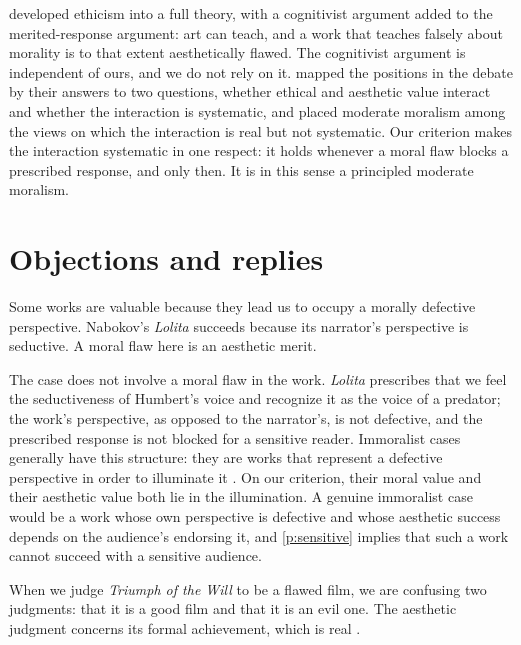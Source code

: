 \documentclass{situationist-preprint}
\begin{document}
\citet{Gaut2007} developed ethicism into a full theory, with a cognitivist argument added to the merited-response argument: art can teach, and a work that teaches falsely about morality is to that extent aesthetically flawed. The cognitivist argument is independent of ours, and we do not rely on it. \citet{Giovannelli2007} mapped the positions in the debate by their answers to two questions, whether ethical and aesthetic value interact and whether the interaction is systematic, and placed moderate moralism among the views on which the interaction is real but not systematic. Our criterion makes the interaction systematic in one respect: it holds whenever a moral flaw blocks a prescribed response, and only then. It is in this sense a principled moderate moralism.

\section{Objections and replies}

\begin{objection}[Immoralism]
Some works are valuable because they lead us to occupy a morally defective perspective. Nabokov's \emph{Lolita} succeeds because its narrator's perspective is seductive. A moral flaw here is an aesthetic merit.
\end{objection}

\begin{reply}
The case does not involve a moral flaw in the work. \emph{Lolita} prescribes that we feel the seductiveness of Humbert's voice and recognize it as the voice of a predator; the work's perspective, as opposed to the narrator's, is not defective, and the prescribed response is not blocked for a sensitive reader. Immoralist cases generally have this structure: they are works that represent a defective perspective in order to illuminate it \citep{Kieran2003}. On our criterion, their moral value and their aesthetic value both lie in the illumination. A genuine immoralist case would be a work whose own perspective is defective and whose aesthetic success depends on the audience's endorsing it, and \ref{p:sensitive} implies that such a work cannot succeed with a sensitive audience.
\end{reply}

\begin{objection}[Autonomism]
When we judge \emph{Triumph of the Will} to be a flawed film, we are confusing two judgments: that it is a good film and that it is an evil one. The aesthetic judgment concerns its formal achievement, which is real \citep{AndersonDean1998}.
\end{objection}
\end{document}
